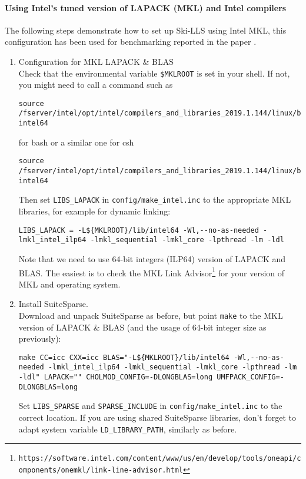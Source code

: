 \documentclass[english,11pt]{article}
\begin{document}
\paragraph{Using Intel's tuned version of LAPACK (MKL) and Intel compilers}
The following steps demonstrate how to set up Ski-LLS using Intel MKL, this configuration has been used for benchmarking reported in the paper \cite{Zhen:OpOnline}.
\begin{enumerate}
    \item Configuration for MKL LAPACK \& BLAS\\
    Check that the environmental variable {\tt \$MKLROOT} is set in your shell. If not, you might need to call a command such as  
    \begin{lstlisting}[breaklines=true, showstringspaces=false]
    source /fserver/intel/opt/intel/compilers_and_libraries_2019.1.144/linux/bin/compilervars.sh intel64
    \end{lstlisting}
    for bash or a similar one for csh
    \begin{lstlisting}[breaklines=true, showstringspaces=false]
    source /fserver/intel/opt/intel/compilers_and_libraries_2019.1.144/linux/bin/compilervars.csh intel64
    \end{lstlisting}
    Then set {\tt LIBS_LAPACK} in {\tt config/make_intel.inc} to the appropriate MKL libraries, for example for dynamic linking:
    \begin{lstlisting}[breaklines=true, showstringspaces=false]
    LIBS_LAPACK = -L${MKLROOT}/lib/intel64 -Wl,--no-as-needed -lmkl_intel_ilp64 -lmkl_sequential -lmkl_core -lpthread -lm -ldl
    \end{lstlisting}
    Note that we need to use 64-bit integers (ILP64) version of LAPACK and BLAS. The easiest is to check the MKL Link Advisor\footnote{\tt https://software.intel.com/content/www/us/en/develop/tools/oneapi/components/onemkl/link-line-advisor.html} for your version of MKL and operating system. 
    \item Install SuiteSparse.\\
    Download and unpack SuiteSparse as before, but point {\tt make} to the MKL version of LAPACK \& BLAS (and the usage of 64-bit integer size as previously):
    \begin{lstlisting}[breaklines=true, showstringspaces=false]
    make CC=icc CXX=icc BLAS="-L${MKLROOT}/lib/intel64 -Wl,--no-as-needed -lmkl_intel_ilp64 -lmkl_sequential -lmkl_core -lpthread -lm -ldl" LAPACK="" CHOLMOD_CONFIG=-DLONGBLAS=long UMFPACK_CONFIG=-DLONGBLAS=long
    \end{lstlisting}
    Set {\tt LIBS_SPARSE} and {\tt SPARSE_INCLUDE} in {\tt config/make_intel.inc} to the correct location. If you are using shared SuiteSparse libraries, don't forget to adapt system variable {\tt LD_LIBRARY_PATH}, similarly as before.


\end{enumerate}
\end{document}
